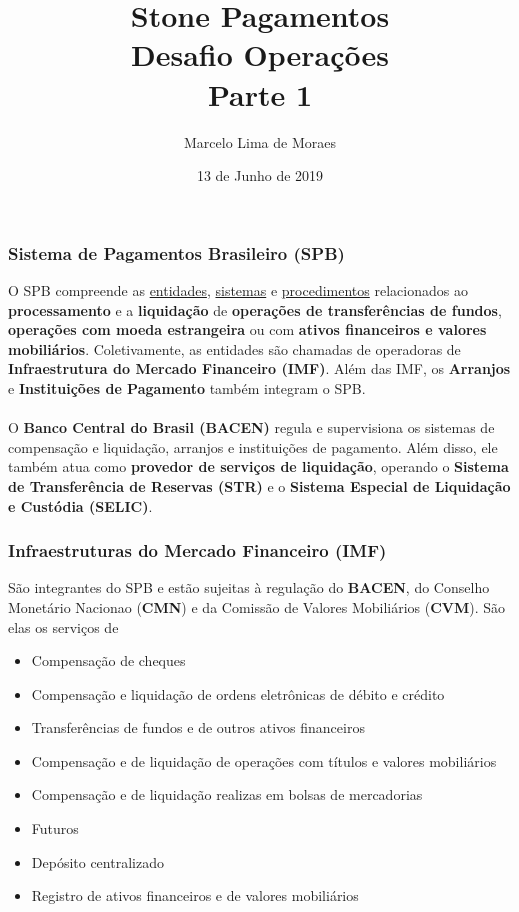 \documentclass[10pt]{beamer}
\title{Stone Pagamentos\\ Desafio Operações\\ Parte 1}
\author{Marcelo Lima de Moraes}
\date{13 de Junho de 2019}
\begin{document}
\frame{\titlepage}

\begin{frame} 
\frametitle{Sistema de Pagamentos Brasileiro (SPB)}

O SPB compreende as \underline{entidades}, \underline{sistemas} e \underline{procedimentos} relacionados ao \textbf{processamento} e a \textbf{liquidação} de \textbf{operações de transferências de fundos}, \textbf{operações com moeda estrangeira} ou com \textbf{ativos financeiros e valores mobiliários}. Coletivamente, as entidades são chamadas de operadoras de \textbf{Infraestrutura do Mercado Financeiro (IMF)}. Além das IMF, os \textbf{Arranjos} e \textbf{Instituições de Pagamento} também integram o SPB.
\\~\\

O \textbf{Banco Central do Brasil (BACEN)} regula e supervisiona os sistemas de compensação e liquidação, arranjos e instituições de pagamento. Além disso, ele também atua como \textbf{provedor de serviços de liquidação}, operando o \textbf{Sistema de Transferência de Reservas (STR)} e o \textbf{Sistema Especial de Liquidação e Custódia (SELIC)}.
\end{frame}

\begin{frame} 
\frametitle{Infraestruturas do Mercado Financeiro (IMF)}

São integrantes do SPB e estão sujeitas à regulação do \textbf{BACEN}, do Conselho Monetário Nacionao (\textbf{CMN}) e da Comissão de Valores Mobiliários (\textbf{CVM}). São elas os serviços de
\begin{itemize}
	\item Compensação de cheques
	\item Compensação e liquidação de ordens eletrônicas de débito e crédito
	\item Transferências de fundos e de outros ativos financeiros
	\item Compensação e de liquidação de operações com títulos e valores mobiliários
	\item Compensação e de liquidação realizas em bolsas de mercadorias
	\item Futuros
	\item Depósito centralizado
	\item Registro de ativos financeiros e de valores mobiliários
\end{itemize}
\end{frame}
\end{document}
